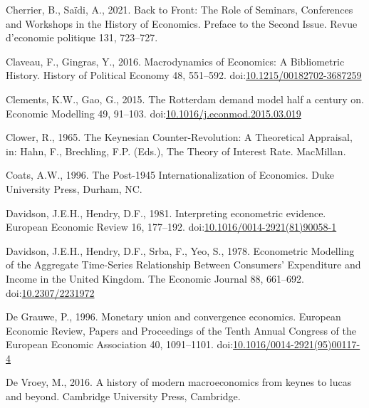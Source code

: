 \documentclass[
  12pt,
  onecolumn]{article}
\newlength{\cslhangindent}
\newlength{\cslentryspacingunit} %
\newenvironment{CSLReferences}[2] %
 {%
  \setlength{\parindent}{0pt}
  \ifodd #1
  \let\oldpar\par
  \def\par{\hangindent=\cslhangindent\oldpar}
  \fi
  \setlength{\parskip}{#2\cslentryspacingunit}
 }%
 {}
\begin{document}
\begin{CSLReferences}{1}{0}
\leavevmode{}%
Cherrier, B., Saïdi, A., 2021. Back to {Front}: {The Role} of {Seminars}, {Conferences} and {Workshops} in the {History} of {Economics}. {Preface} to the {Second Issue}. Revue d'economie politique 131, 723--727.

\leavevmode{}%
Claveau, F., Gingras, Y., 2016. Macrodynamics of {Economics}: {A Bibliometric History}. History of Political Economy 48, 551--592. doi:\href{https://doi.org/10.1215/00182702-3687259}{10.1215/00182702-3687259}

\leavevmode{}%
Clements, K.W., Gao, G., 2015. The {Rotterdam} demand model half a century on. Economic Modelling 49, 91--103. doi:\href{https://doi.org/10.1016/j.econmod.2015.03.019}{10.1016/j.econmod.2015.03.019}

\leavevmode{}%
Clower, R., 1965. The {Keynesian Counter-Revolution}: {A Theoretical Appraisal}, in: Hahn, F., Brechling, F.P. (Eds.), The {Theory} of {Interest Rate}. {MacMillan}.

\leavevmode{}%
Coats, A.W., 1996. The Post-1945 Internationalization of Economics. Duke University Press, Durham, NC.

\leavevmode{}%
Davidson, J.E.H., Hendry, D.F., 1981. Interpreting econometric evidence. European Economic Review 16, 177--192. doi:\href{https://doi.org/10.1016/0014-2921(81)90058-1}{10.1016/0014-2921(81)90058-1}

\leavevmode{}%
Davidson, J.E.H., Hendry, D.F., Srba, F., Yeo, S., 1978. Econometric {Modelling} of the {Aggregate Time-Series Relationship Between Consumers}' {Expenditure} and {Income} in the {United Kingdom}. The Economic Journal 88, 661--692. doi:\href{https://doi.org/10.2307/2231972}{10.2307/2231972}

\leavevmode{}%
De Grauwe, P., 1996. Monetary union and convergence economics. European Economic Review, Papers and {Proceedings} of the {Tenth Annual Congress} of the {European Economic Association} 40, 1091--1101. doi:\href{https://doi.org/10.1016/0014-2921(95)00117-4}{10.1016/0014-2921(95)00117-4}

\leavevmode{}%
De Vroey, M., 2016. A history of modern macroeconomics from keynes to lucas and beyond. Cambridge University Press, Cambridge.


\end{CSLReferences}
\end{document}
